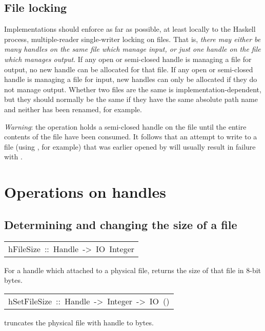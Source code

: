 \subsection{File locking
}
Implementations should enforce as far as possible, at least locally to the
 Haskell process, multiple-reader single-writer locking on files.
 That is, \emph{there may either be many handles on the same file which manage input, or just one handle on the file which manages output}.  If any
 open or semi-closed handle is managing a file for output, no new
 handle can be allocated for that file.  If any open or semi-closed
 handle is managing a file for input, new handles can only be allocated
 if they do not manage output.  Whether two files are the same is
 implementation-dependent, but they should normally be the same if they
 have the same absolute path name and neither has been renamed, for
 example.
\par
\emph{Warning}: the  operation holds a semi-closed handle on
 the file until the entire contents of the file have been consumed.
 It follows that an attempt to write to a file (using , for
 example) that was earlier opened by  will usually result in
 failure with .
\par

\section{Operations on handles
}
\subsection{Determining and changing the size of a file
}
\begin{haddockdesc}
\item[\begin{tabular}{@{}l}
hFileSize\ ::\ Handle\ ->\ IO\ Integer
\end{tabular}]\haddockbegindoc
For a handle  which attached to a physical file,
   returns the size of that file in 8-bit bytes.
\par

\end{haddockdesc}
\begin{haddockdesc}
\item[\begin{tabular}{@{}l}
hSetFileSize\ ::\ Handle\ ->\ Integer\ ->\ IO\ ()
\end{tabular}]\haddockbegindoc
{}   truncates the physical file with handle  to  bytes.
\par

\end{haddockdesc}
